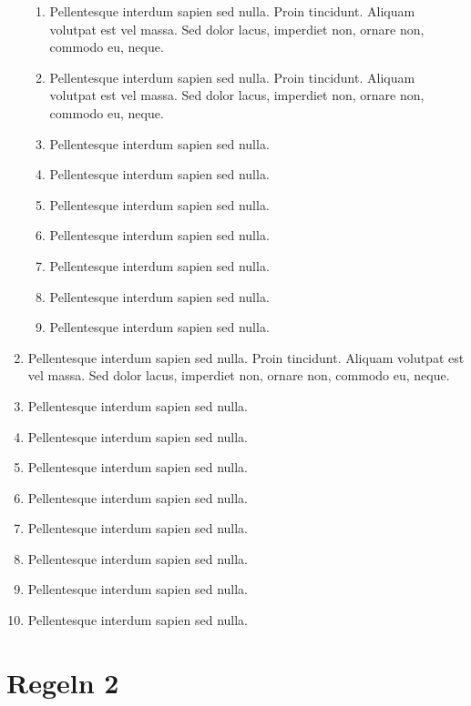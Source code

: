 \documentclass[ngerman]{scrartcl}
\begin{document}
\begin{enumerate}
\begin{enumerate}
				\item Pellentesque interdum sapien sed nulla. Proin tincidunt. Aliquam volutpat est vel massa. Sed
dolor lacus, imperdiet non, ornare non, commodo eu, neque.
				\item Pellentesque interdum sapien sed nulla. Proin tincidunt. Aliquam volutpat est vel massa. Sed
dolor lacus, imperdiet non, ornare non, commodo eu, neque.
				\item Pellentesque interdum sapien sed nulla.
				\item Pellentesque interdum sapien sed nulla.
				\item Pellentesque interdum sapien sed nulla.
				\item Pellentesque interdum sapien sed nulla.
				\item Pellentesque interdum sapien sed nulla.
				\item Pellentesque interdum sapien sed nulla.
				\item Pellentesque interdum sapien sed nulla.
			\end{enumerate}
		\item Pellentesque interdum sapien sed nulla. Proin tincidunt. Aliquam volutpat est vel massa. Sed
dolor lacus, imperdiet non, ornare non, commodo eu, neque.
		\item Pellentesque interdum sapien sed nulla.
		\item Pellentesque interdum sapien sed nulla.
		\item Pellentesque interdum sapien sed nulla.
		\item Pellentesque interdum sapien sed nulla.
		\item Pellentesque interdum sapien sed nulla.
		\item Pellentesque interdum sapien sed nulla.
		\item Pellentesque interdum sapien sed nulla.
		\item Pellentesque interdum sapien sed nulla.
	\end{enumerate}

	\section{Regeln 2}
\end{document}
